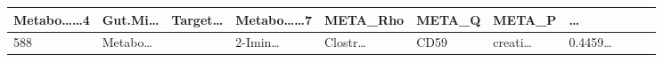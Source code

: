 \documentclass[
]{article}
\begin{document}
\begin{longtable}[]{@{}lllllllllll@{}}
\begin{minipage}[b]{0.09\columnwidth}
Metabo\ldots\ldots4\strut
\end{minipage} & \begin{minipage}[b]{0.07\columnwidth}\raggedright
Gut.Mi\ldots{}\strut
\end{minipage} & \begin{minipage}[b]{0.07\columnwidth}\raggedright
Target\ldots{}\strut
\end{minipage} & \begin{minipage}[b]{0.09\columnwidth}\raggedright
Metabo\ldots\ldots7\strut
\end{minipage} & \begin{minipage}[b]{0.07\columnwidth}\raggedright
META\_Rho\strut
\end{minipage} & \begin{minipage}[b]{0.07\columnwidth}\raggedright
META\_Q\strut
\end{minipage} & \begin{minipage}[b]{0.07\columnwidth}\raggedright
META\_P\strut
\end{minipage} & \begin{minipage}[b]{0.03\columnwidth}\raggedright
\ldots{}\strut
\end{minipage}\tabularnewline
\midrule
\endhead
\begin{minipage}[t]{0.03\columnwidth}\raggedright
588\strut
\end{minipage} & \begin{minipage}[t]{0.07\columnwidth}\raggedright
Metabo\ldots{}\strut
\end{minipage} & \begin{minipage}[t]{0.07\columnwidth}\raggedright
\strut
\end{minipage} & \begin{minipage}[t]{0.09\columnwidth}\raggedright
2-Imin\ldots{}\strut
\end{minipage} & \begin{minipage}[t]{0.07\columnwidth}\raggedright
Clostr\ldots{}\strut
\end{minipage} & \begin{minipage}[t]{0.07\columnwidth}\raggedright
CD59\strut
\end{minipage} & \begin{minipage}[t]{0.09\columnwidth}\raggedright
creati\ldots{}\strut
\end{minipage} & \begin{minipage}[t]{0.07\columnwidth}\raggedright
0.4459\ldots{}\strut
\end{minipage} & \begin{minipage}[t]{0.07\columnwidth}\raggedright

\end{minipage}
\end{longtable}
\end{document}
